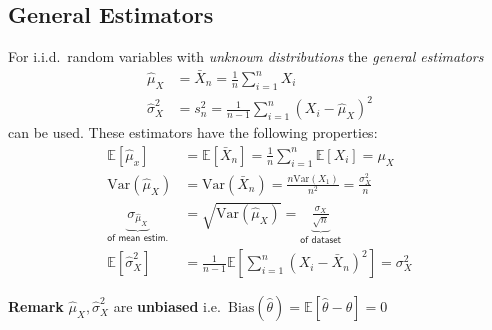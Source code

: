 \subsection{General Estimators}
For i.i.d.\ random variables with \textit{unknown distributions} the \textit{general estimators}
\noindent\begin{align*}
    \widehat{\mu}_{X}    & =\bar{X}_{n}=\frac1n\sum_{i=1}^{n}X_{i}             \\
    \widehat{\sigma}_X^2 & =s_n^2=\frac1{n-1}\sum_{i=1}^n{(X_i-\widehat{\mu}_X)}^2
\end{align*}
can be used. These estimators have the following properties:
\noindent\begin{align*}
    \mathbb{E}[\widehat{\mu}_x]                                       & =\mathbb{E}[\bar{X}_n]=\frac1n\sum_{i=1}^n\mathbb{E}[X_i]=\mu_X                                    \\
    \mathrm{Var}(\widehat{\mu}_X)                                     & =\mathrm{Var}(\bar{X}_n)=\frac{n\mathrm{Var}(X_1)}{n^2}=\frac{\sigma_X^2}n                         \\
    \underbrace{\sigma_{\widehat{\mu}_{X}}}_{\textsf{of mean estim.}} & =\sqrt{\mathrm{Var}(\widehat{\mu}_{X})}=\underbrace{\frac{\sigma_{X}}{\sqrt{n}}}_{\textsf{of dataset}} \\
    \mathbb{E}[\widehat{\sigma}_X^2]                                  & =\frac1{n-1}\mathbb{E}\left[\sum_{i=1}^n{\left(X_i-\bar{X}_n\right)}^2\right] = \sigma^2_X
\end{align*}

\textbf{Remark} $\widehat{\mu}_X, \widehat{\sigma}_X^2$ are \textbf{unbiased} i.e.\ $\mathrm{Bias}(\widehat{\theta})=\mathbb{E}[\widehat{\theta}-\theta]=0$
